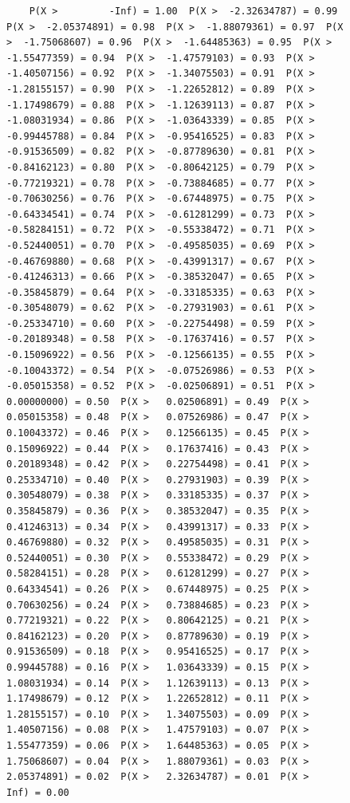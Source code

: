 \documentclass[
  letterpaper,
  DIV=11,
  numbers=noendperiod]{scrartcl}
\theoremstyle{definition}
\theoremstyle{definition}
\theoremstyle{definition}
\theoremstyle{remark}
\begin{document}
\begin{figure}
{\begin{verbatim}
    P(X >         -Inf) = 1.00  P(X >  -2.32634787) = 0.99  P(X >  -2.05374891) = 0.98  P(X >  -1.88079361) = 0.97  P(X >  -1.75068607) = 0.96  P(X >  -1.64485363) = 0.95  P(X >  -1.55477359) = 0.94  P(X >  -1.47579103) = 0.93  P(X >  -1.40507156) = 0.92  P(X >  -1.34075503) = 0.91  P(X >  -1.28155157) = 0.90  P(X >  -1.22652812) = 0.89  P(X >  -1.17498679) = 0.88  P(X >  -1.12639113) = 0.87  P(X >  -1.08031934) = 0.86  P(X >  -1.03643339) = 0.85  P(X >  -0.99445788) = 0.84  P(X >  -0.95416525) = 0.83  P(X >  -0.91536509) = 0.82  P(X >  -0.87789630) = 0.81  P(X >  -0.84162123) = 0.80  P(X >  -0.80642125) = 0.79  P(X >  -0.77219321) = 0.78  P(X >  -0.73884685) = 0.77  P(X >  -0.70630256) = 0.76  P(X >  -0.67448975) = 0.75  P(X >  -0.64334541) = 0.74  P(X >  -0.61281299) = 0.73  P(X >  -0.58284151) = 0.72  P(X >  -0.55338472) = 0.71  P(X >  -0.52440051) = 0.70  P(X >  -0.49585035) = 0.69  P(X >  -0.46769880) = 0.68  P(X >  -0.43991317) = 0.67  P(X >  -0.41246313) = 0.66  P(X >  -0.38532047) = 0.65  P(X >  -0.35845879) = 0.64  P(X >  -0.33185335) = 0.63  P(X >  -0.30548079) = 0.62  P(X >  -0.27931903) = 0.61  P(X >  -0.25334710) = 0.60  P(X >  -0.22754498) = 0.59  P(X >  -0.20189348) = 0.58  P(X >  -0.17637416) = 0.57  P(X >  -0.15096922) = 0.56  P(X >  -0.12566135) = 0.55  P(X >  -0.10043372) = 0.54  P(X >  -0.07526986) = 0.53  P(X >  -0.05015358) = 0.52  P(X >  -0.02506891) = 0.51  P(X >   0.00000000) = 0.50  P(X >   0.02506891) = 0.49  P(X >   0.05015358) = 0.48  P(X >   0.07526986) = 0.47  P(X >   0.10043372) = 0.46  P(X >   0.12566135) = 0.45  P(X >   0.15096922) = 0.44  P(X >   0.17637416) = 0.43  P(X >   0.20189348) = 0.42  P(X >   0.22754498) = 0.41  P(X >   0.25334710) = 0.40  P(X >   0.27931903) = 0.39  P(X >   0.30548079) = 0.38  P(X >   0.33185335) = 0.37  P(X >   0.35845879) = 0.36  P(X >   0.38532047) = 0.35  P(X >   0.41246313) = 0.34  P(X >   0.43991317) = 0.33  P(X >   0.46769880) = 0.32  P(X >   0.49585035) = 0.31  P(X >   0.52440051) = 0.30  P(X >   0.55338472) = 0.29  P(X >   0.58284151) = 0.28  P(X >   0.61281299) = 0.27  P(X >   0.64334541) = 0.26  P(X >   0.67448975) = 0.25  P(X >   0.70630256) = 0.24  P(X >   0.73884685) = 0.23  P(X >   0.77219321) = 0.22  P(X >   0.80642125) = 0.21  P(X >   0.84162123) = 0.20  P(X >   0.87789630) = 0.19  P(X >   0.91536509) = 0.18  P(X >   0.95416525) = 0.17  P(X >   0.99445788) = 0.16  P(X >   1.03643339) = 0.15  P(X >   1.08031934) = 0.14  P(X >   1.12639113) = 0.13  P(X >   1.17498679) = 0.12  P(X >   1.22652812) = 0.11  P(X >   1.28155157) = 0.10  P(X >   1.34075503) = 0.09  P(X >   1.40507156) = 0.08  P(X >   1.47579103) = 0.07  P(X >   1.55477359) = 0.06  P(X >   1.64485363) = 0.05  P(X >   1.75068607) = 0.04  P(X >   1.88079361) = 0.03  P(X >   2.05374891) = 0.02  P(X >   2.32634787) = 0.01  P(X >          Inf) = 0.00
\end{verbatim}

}
\end{figure}
\end{document}
